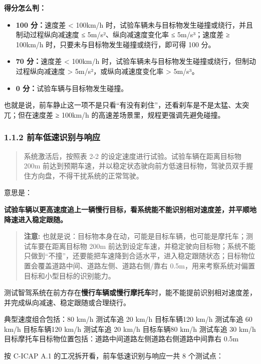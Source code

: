 \textbf{得分怎么判：}

\begin{itemize}
  \item \textbf{100 分：}速度差 < 100km/h 时，试验车辆未与目标物发生碰撞或绕行，并且制动过程纵向减速度 ≤ 5m/s²、纵向减速度变化率 ≤ 5m/s³；速度差 ≥ 100km/h 时，只要未与目标物发生碰撞或绕行，即可得 100 分。
  \item \textbf{70 分：}速度差 < 100km/h 时，试验车辆未与目标物发生碰撞或绕行，但制动过程纵向减速度 > 5m/s²，或纵向减速度变化率 > 5m/s³。
  \item \textbf{0 分：}试验车辆与目标物发生碰撞。
\end{itemize}

也就是说，前车静止这一项不是只看“有没有刹住”，还看刹车是不是太猛、太突兀；但在速度差 ≥ 100km/h 的高速差场景里，规程更强调先避免碰撞。

\subsubsection{1.1.2 前车低速识别与响应}

\begin{quote}
  系统激活后，按照表 2-2 的设定速度进行试验。试验车辆在距离目标物 200m 前达到预期车速，并以稳定状态驶向前方低速目标物，驾驶员双手握住方向盘，不得干扰系统的正常驾驶。
\end{quote}

意思是：

\textbf{试验车辆以更高速度追上一辆慢行目标，看系统能不能识别相对速度差，并平顺地降速进入稳定跟随。}

\begin{quote}
  \textbf{注意:} 也就是说：目标物本身在动，可能是目标车辆，也可能是摩托车；测试车要在距离目标物 200m 前达到设定车速，并稳定驶向目标物；系统不能只做到“不撞”，还要能把车速降到合适水平，进入稳定跟随状态；目标物位置会覆盖道路中间、道路左侧、道路右侧/靠右 0.5m，用来考察系统对偏置目标和小型目标的识别能力。
\end{quote}

测试智驾系统在前方存在\textbf{慢行车辆或慢行摩托车}时，能不能提前识别相对速度差，并完成纵向减速、稳定跟随或合理绕行。

典型速度组合包括：80 km/h 测试车追 20 km/h 目标车辆120 km/h 测试车追 60 km/h 目标车辆120 km/h 测试车追 20 km/h 目标车辆80 km/h 测试车追 30 km/h 目标摩托车目标物位置包括：道路中间道路左侧道路右侧道路中间靠右 0.5m

按 C-ICAP A.1 的工况拆开看，前车低速识别与响应一共 8 个测试点：

